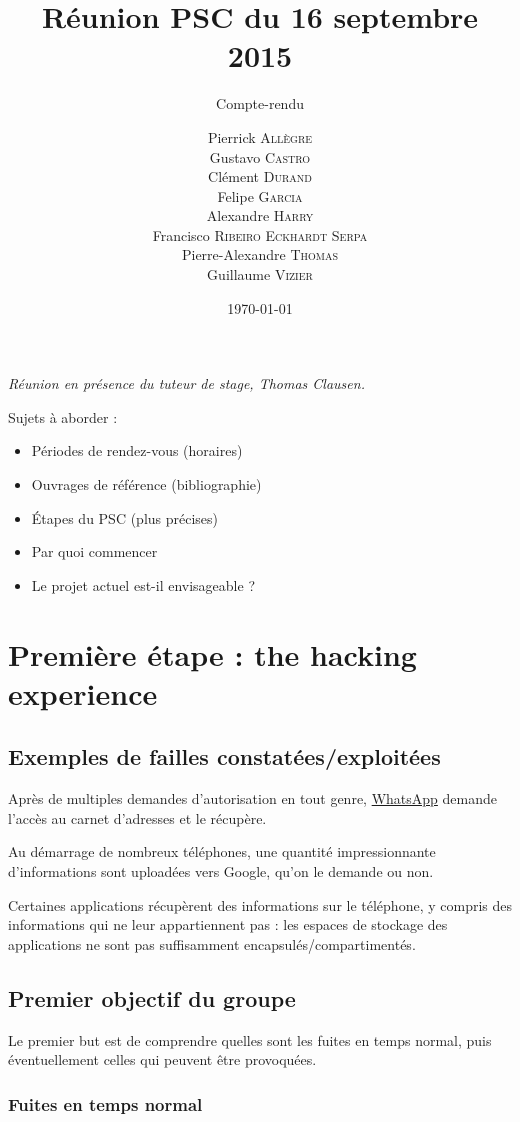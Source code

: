 \documentclass[a4paper, 11pt]{article}
\title{Réunion PSC du 16 septembre 2015}
\author{Pierrick \textsc{Allègre} \\
		Gustavo \textsc{Castro} \\
		Clément \textsc{Durand} \\
		Felipe \textsc{Garcia} \\
		Alexandre \textsc{Harry} \\
		Francisco \textsc{Ribeiro Eckhardt Serpa} \\
		Pierre-Alexandre \textsc{Thomas} \\
		Guillaume \textsc{Vizier}}
\subtitle{Compte-rendu}
\date{\today}
\begin{document}
\maketitle
\tableofcontents\clearpage

{\itshape Réunion en présence du tuteur de stage, Thomas Clausen.}

Sujets à aborder :
\begin{itemize}
	\item Périodes de rendez-vous (horaires)
	\item Ouvrages de référence (bibliographie)
	\item Étapes du PSC (plus précises)
	\item Par quoi commencer
	\item Le projet actuel est-il envisageable ?
\end{itemize}

\section{Première étape : the hacking experience}

	\subsection{Exemples de failles constatées/exploitées}
	
	Après de multiples demandes d'autorisation en tout genre, \href{https://www.whatsapp.com/?l=fr}{WhatsApp} demande l'accès au carnet d'adresses et le récupère.
	
	Au démarrage de nombreux téléphones, une quantité impressionnante d'informations sont uploadées vers Google, qu'on le demande ou non.
	
	Certaines applications récupèrent des informations sur le téléphone, y compris des informations qui ne leur appartiennent pas : les espaces de stockage des applications ne sont pas suffisamment encapsulés/compartimentés.
	
	\subsection{Premier objectif du groupe}
	
	Le premier but est de comprendre quelles sont les fuites en temps normal, puis éventuellement celles qui peuvent être provoquées.
	
		\subsubsection{Fuites en temps normal}
		
\end{document}
